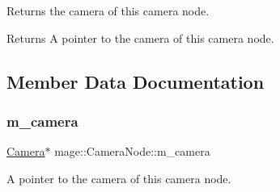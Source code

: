 Returns the camera of this camera node.

\begin{DoxyReturn}{Returns}
A pointer to the camera of this camera node. 
\end{DoxyReturn}


\subsection{Member Data Documentation}
\hypertarget{classmage_1_1_camera_node_aee902112c2e70e8de69b69aed303ca1f}{}\label{classmage_1_1_camera_node_aee902112c2e70e8de69b69aed303ca1f} 
\subsubsection{\texorpdfstring{m\+\_\+camera}{m\_camera}}
{\footnotesize\ttfamily \hyperlink{classmage_1_1_camera}{Camera}$\ast$ mage\+::\+Camera\+Node\+::m\+\_\+camera\hspace{0.3cm}{\ttfamily [protected]}}

A pointer to the camera of this camera node. 
